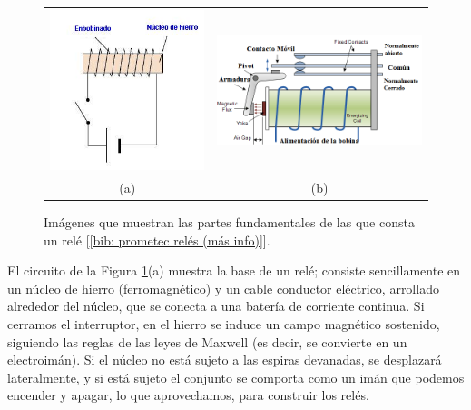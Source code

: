 \documentclass[12pt]{article}
\begin{document}
	
	\begin{figure}[h!]
		\begin{center}
			\begin{tabular}{cc}
				\includegraphics[width=60mm]{img/rele_1.png} &   \includegraphics[width=80mm]{img/rele_2.png} \\
				(a)  & (b)  \\[6pt]
			\end{tabular}
			\caption{Imágenes que muestran las partes fundamentales de las que consta un relé [\ref{bib: prometec relés (más info)}].}
			\label{Rele: teoria}
		\end{center}
	\end{figure}
	
	\pagebreak
	
	\noindent El circuito de la Figura \ref{Rele: teoria}(a) muestra la base de un relé; consiste sencillamente en un núcleo de hierro (ferromagnético) y un cable conductor eléctrico, arrollado alrededor del núcleo, que se conecta a una batería de corriente continua. Si cerramos el interruptor, en el hierro se induce un campo  magnético sostenido, siguiendo las reglas de las leyes de Maxwell (es decir, se convierte en un electroimán). Si el núcleo no está sujeto a las espiras devanadas, se desplazará lateralmente, y si está sujeto el conjunto se comporta como un imán que podemos encender y apagar, lo que aprovechamos, para construir los relés.
	
\end{document}
